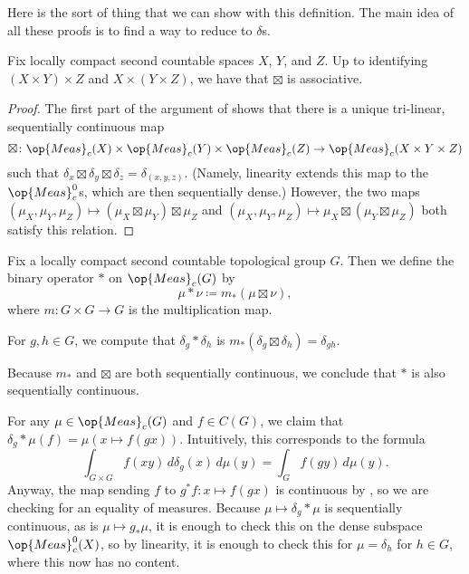 \documentclass[../notes.tex]{subfiles}
\begin{document}
Here is the sort of thing that we can show with this definition. The main idea of all these proofs is to find a way to reduce to $\delta$s.
\begin{lemma}
	Fix locally compact second countable spaces $X$, $Y$, and $Z$. Up to identifying $(X\times Y)\times Z$ and $X\times(Y\times Z)$, we have that $\boxtimes$ is associative.
\end{lemma}
\begin{proof}
	The first part of the argument of  shows that there is a unique tri-linear, sequentially continuous map
	\[\boxtimes\colon\op{Meas}_c(X)\times\op{Meas}_c(Y)\times\op{Meas}_c(Z)\to\op{Meas}_c(X\times Y\times Z)\]
	such that $\delta_x\boxtimes\delta_y\boxtimes\delta_z=\delta_{(x,y,z)}$. (Namely, linearity extends this map to the $\op{Meas}_c^0$s, which are then sequentially dense.) However, the two maps $(\mu_X,\mu_Y,\mu_Z)\mapsto(\mu_X\boxtimes\mu_Y)\boxtimes\mu_Z$ and $(\mu_X,\mu_Y,\mu_Z)\mapsto\mu_X\boxtimes(\mu_Y\boxtimes\mu_Z)$ both satisfy this relation.
\end{proof}
\begin{notation}
	Fix a locally compact second countable topological group $G$. Then we define the binary operator $*$ on $\op{Meas}_c(G)$ by
	\[\mu*\nu\coloneqq m_*(\mu\boxtimes\nu),\]
	where $m\colon G\times G\to G$ is the multiplication map.
\end{notation}
\begin{example}
	For $g,h\in G$, we compute that $\delta_g*\delta_h$ is $m_*(\delta_g\boxtimes\delta_h)=\delta_{gh}$.
\end{example}
\begin{remark}
	Because $m_*$ and $\boxtimes$ are both sequentially continuous, we conclude that $*$ is also sequentially continuous.
\end{remark}
\begin{example} \label{ex:multiply-g-mu}
	For any $\mu\in\op{Meas}_c(G)$ and $f\in C(G)$, we claim that $\delta_g*\mu(f)=\mu(x\mapsto f(gx))$. Intuitively, this corresponds to the formula
	\[\int_{G\times G}f(xy)\,d\delta_g(x)\,d\mu(y)=\int_Gf(gy)\,d\mu(y).\]
	Anyway, the map sending $f$ to $g^*f\colon x\mapsto f(gx)$ is continuous by , so we are checking for an equality of measures. Because $\mu\mapsto\delta_g*\mu$ is sequentially continuous, as is $\mu\mapsto g_*\mu$, it is enough to check this on the dense subspace $\op{Meas}_c^0(X)$, so by linearity, it is enough to check this for $\mu=\delta_h$ for $h\in G$, where this now has no content.
\end{example}
\end{document}
